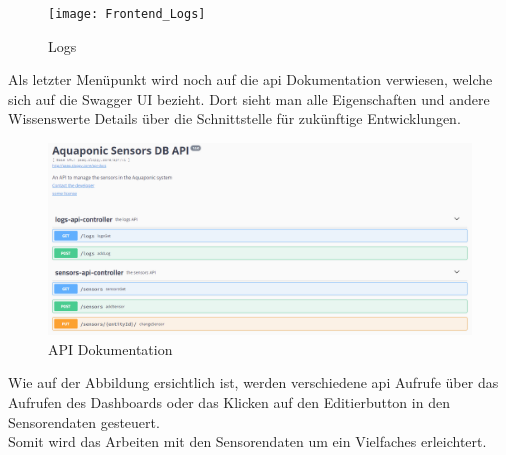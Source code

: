\documentclass[../main.tex]{subfiles}
\begin{document}
	\begin{figure}[H]
		\centering
		\texttt{[image: Frontend\_Logs]}
		\caption{Logs}
		\label{fig:Frontend_Logs}
	\end{figure}
	\par
	\noindent
	Als letzter Menüpunkt wird noch auf die \gls{api} Dokumentation verwiesen, welche sich auf die Swagger UI bezieht. Dort sieht man alle Eigenschaften und andere Wissenswerte Details über die Schnittstelle für zukünftige Entwicklungen.\par 
	\begin{figure}[H]
		\centering
		\includegraphics[scale=0.4]{../images/API_Documentation}
		\caption{API Dokumentation}
		\label{fig:API_Documentation}
	\end{figure}
	\noindent
	Wie auf der Abbildung ersichtlich ist, werden verschiedene \gls{api} Aufrufe über das Aufrufen des Dashboards oder das Klicken auf den Editierbutton in den Sensorendaten gesteuert. 
	\\
	Somit wird das Arbeiten mit den Sensorendaten um ein Vielfaches erleichtert.
\end{document}

